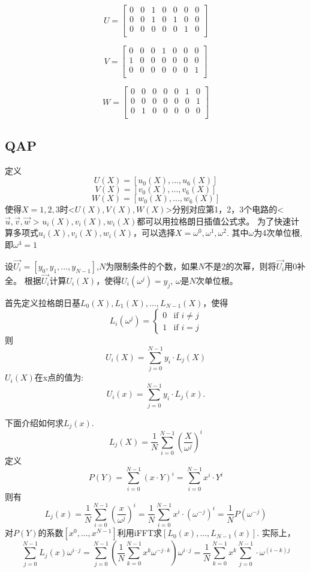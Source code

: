 \documentclass{article}
\begin{document}
$$
U=\begin{bmatrix}
0&0&1&0&0&0&0\\
0&0&1&0&1&0&0\\
0&0&0&0&0&1&0\\
\end{bmatrix}
$$

$$
V=\begin{bmatrix}
0&0&0&1&0&0&0\\
1&0&0&0&0&0&0\\
0&0&0&0&0&0&1\\
\end{bmatrix}
$$

$$
W=\begin{bmatrix}
0&0&0&0&0&1&0\\
0&0&0&0&0&0&1\\
0&1&0&0&0&0&0\\
\end{bmatrix}
$$

\subsection{QAP}
定义
$$U(X)=[u_0(X),...,u_6(X)]$$
$$V(X)=[v_0(X),...,v_6(X)]$$
$$W(X)=[w_0(X),...,w_6(X)]$$
使得$X=1,2,3$时<$U(X),V(X),W(X)$>分别对应第1，2，3个电路的<$\overrightarrow{u},\overrightarrow{v},\overrightarrow{w}$ >
$u_i(X),v_i(X),w_i(X)$都可以用拉格朗日插值公式求。
为了快速计算多项式$u_i(X),v_i(X),w_i(X)$，可以选择$X=\omega^0,\omega^1,\omega^2$. 其中$\omega$为4次单位根,
即$\omega^4=1$

设$\overrightarrow{U_i}=[y_0,y_1,...,y_{N-1}]$,$N$为限制条件的个数，如果$N$不是2的次幂，则将$\overrightarrow{U_i}$用0补全。
根据$\overrightarrow{U_i}$计算$U_i(X)$，使得$U_i(\omega^j)=y_j$, $\omega$是$N$次单位根。

首先定义拉格朗日基${L_0(X),L_1(X),...,L_{N-1}(X)}$，使得
$$
L_i(\omega^j) = \begin{cases}
    0 &\text{if } i\not = j \\
    1 &\text{if } i=j
 \end{cases}
 $$
则  
$$U_i(X) = \sum_{j=0}^{N-1}{y_i\cdot L_j(X)}$$
$U_i(X)$在x点的值为: 
$$U_i(x)=\sum_{j=0}^{N-1}{y_i\cdot L_j(x)}.$$

下面介绍如何求$L_j(x)$.
$$L_j(X) = \frac{1}{N}{\sum_{i=0}^{N-1}({\frac{X}{\omega^j}})^i}$$
 定义
 $$P(Y)=\sum_{i=0}^{N-1}{(x\cdot Y)^i}=\sum_{i=0}^{N-1}{{x}^i\cdot Y^i} $$
则有
$$ L_j(x) =\frac{1}{N}\sum_{i=0}^{N-1}{(\frac{x}{\omega^j})^i}
=\frac{1}{N}\sum_{i=0}^{N-1}{{x}^i\cdot (\omega^{-j})^i}
=\frac{1}{N}{P(\omega^{-j})}$$
对$P(Y)$的系数$[x^0,...,x^{N-1}]$利用iFFT求$[L_0(x),...,L_{N-1}(x)]$.
实际上，
$$
\sum_{j=0}^{N-1} L_j(x)\omega^{i\cdot j}
=\sum_{j=0}^{N-1} (\frac{1}{N}\sum_{k=0}^{N-1}x^k \omega^{-j\cdot k}) \omega^{i\cdot j}
=\frac{1}{N}\sum_{k=0}^{N-1}x^k\sum_{j=0}^{N-1} \cdot \omega^{(i-k)j}
$$
\end{document}
